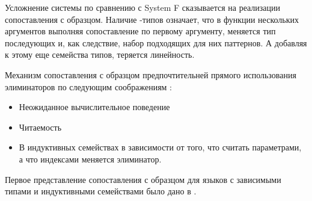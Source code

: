 Усложнение системы по сравнению с System F сказывается на реализации сопоставления
с образцом. Наличие \textPi-типов означает, что в функции нескольких аргументов
выполняя сопоставление по первому аргументу, меняется тип последующих и, как
следствие, набор подходящих для них паттернов. А добавляя к этому еще семейства
типов, теряется линейность.

Механизм сопоставления с образцом предпочтительней прямого использования
элиминаторов по следующим соображениям \cite{dependent-pattern-matching}:
\begin{itemize}
\item Неожиданное вычислительное поведение
\item Читаемость
\item В индуктивных семействах в зависимости от того, что считать параметрами,
  а что индексами меняется элиминатор.
\end{itemize}

Первое представление сопоставления с образцом для языков с зависимыми типами и
индуктивными семействами было дано в \cite{dependent-pattern-matching}.

